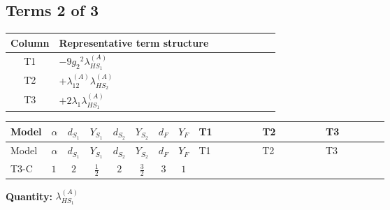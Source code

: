 \documentclass[8pt]{article}
\begin{document}
\begin{landscape}
\subsection*{Terms 2 of 3}
\begin{center}
\begin{tabular}{@{}c >{\raggedright\arraybackslash}p{0.82\linewidth}@{}}
\toprule
Column & Representative term structure \\
\midrule
T1 & \(\displaystyle -9 {g_2}^2 {\lambda_{HS_1}^{(A)}}\) \\
\midrule
T2 & \(\displaystyle +{\lambda_{12}^{(A)}} {\lambda_{HS_2}^{(A)}}\) \\
\midrule
T3 & \(\displaystyle +2 {\lambda_1} {\lambda_{HS_1}^{(A)}}\) \\
\midrule
\bottomrule
\end{tabular}
\end{center}
\smallskip
\tiny
\begin{longtable}{@{}llcccccc >{\raggedright\arraybackslash}p{0.21\linewidth} >{\raggedright\arraybackslash}p{0.21\linewidth} >{\raggedright\arraybackslash}p{0.21\linewidth}@{}}
\toprule
Model & $\alpha$ & $d_{S_1}$ & $Y_{S_1}$ & $d_{S_2}$ & $Y_{S_2}$ & $d_F$ & $Y_F$ & T1 & T2 & T3 \\
\midrule
\endfirsthead
\toprule
Model & $\alpha$ & $d_{S_1}$ & $Y_{S_1}$ & $d_{S_2}$ & $Y_{S_2}$ & $d_F$ & $Y_F$ & T1 & T2 & T3 \\
\midrule
\endhead
T3-C & $1$ & $2$ & $\frac{1}{2}$ & $2$ & $\frac{3}{2}$ & $3$ & $1$ & \scriptsize\adjustbox{max width=\linewidth}{$\begin{gathered} -9 {g_2}^2 {\lambda_{HS_1}^{(A)}}\end{gathered}$} & \scriptsize\adjustbox{max width=\linewidth}{$\begin{gathered} +{\lambda_{12}^{(A)}} {\lambda_{HS_2}^{(A)}}\end{gathered}$} & \scriptsize\adjustbox{max width=\linewidth}{$\begin{gathered} +2 {\lambda_1} {\lambda_{HS_1}^{(A)}}\end{gathered}$} \\
\midrule
\bottomrule
\end{longtable}
\clearpage
\noindent\textbf{Quantity: }$\lambda_{HS_1}^{(A)}$\par\smallskip

\end{landscape}
\end{document}
